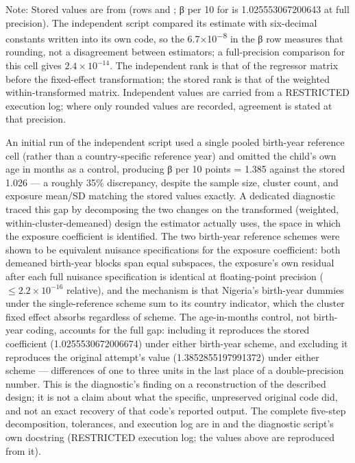 \begin{ThesisTableNote}

\raggedright

Note: Stored values are from  (rows  and ; β per 10 for  is 1.025553067200643 at full precision). The independent script compared its estimate with six-decimal constants written into its own code, so the 6.7×10\textsuperscript{−8} in the β row measures that rounding, not a disagreement between estimators; a full-precision comparison for this cell gives \(2.4\times10^{-14}\). The independent rank is that of the regressor matrix before the fixed-effect transformation; the stored rank is that of the weighted within-transformed matrix. Independent values are carried from a RESTRICTED execution log; where only rounded values are recorded, agreement is stated at that precision.

\end{ThesisTableNote}

An initial run of the independent script used a single pooled birth-year reference cell (rather than a country-specific reference year) and omitted the child's own age in months as a control, producing β per 10 points = 1.385 against the stored 1.026 --- a roughly 35\% discrepancy, despite the sample size, cluster count, and exposure mean/SD matching the stored values exactly. A dedicated diagnostic traced this gap by decomposing the two changes on the transformed (weighted, within-cluster-demeaned) design the estimator actually uses, the space in which the exposure coefficient is identified. The two birth-year reference schemes were shown to be equivalent nuisance specifications for the exposure coefficient: both demeaned birth-year blocks span equal subspaces, the exposure's own residual after each full nuisance specification is identical at floating-point precision (\(\le2.2\times10^{-16}\) relative), and the mechanism is that Nigeria's birth-year dummies under the single-reference scheme sum to its country indicator, which the cluster fixed effect absorbs regardless of scheme. The age-in-months control, not birth-year coding, accounts for the full gap: including it reproduces the stored coefficient (1.0255530672006674) under either birth-year scheme, and excluding it reproduces the original attempt's value (1.3852855197991372) under either scheme --- differences of one to three units in the last place of a double-precision number. This is the diagnostic's finding on a reconstruction of the described design; it is not a claim about what the specific, unpreserved original code did, and not an exact recovery of that code's reported output. The complete five-step decomposition, tolerances, and execution log are in  and the diagnostic script's own docstring (RESTRICTED execution log; the values above are reproduced from it).

